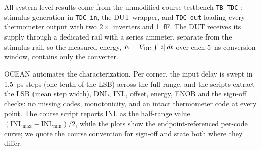 All system-level results come from the unmodified course testbench
\texttt{TB\_TDC} \cite{ee4615tb}: stimulus generation in \texttt{TDC\_in},
the DUT wrapper, and \texttt{TDC\_out} loading every thermometer output with
two $2\times$ inverters and \SI{1}{\femto\farad}. The DUT receives its supply
through a dedicated rail with a series ammeter, separate from the stimulus
rail, so the measured energy, $E=V_{\mathrm{DD}}\int |i|\,dt$ over each
\SI{5}{\nano\second} conversion window, contains only the converter.

OCEAN automates the characterization. Per corner, the input delay is swept in
\SI{1.5}{\pico\second} steps (one tenth of the LSB) across the full range,
and the scripts extract the LSB (mean step width), DNL, INL, offset, energy,
ENOB and the sign-off checks: no missing codes, monotonicity, and an intact
thermometer code at every point. The course script reports INL as the
half-range value $(\mathrm{INL}_{\max}-\mathrm{INL}_{\min})/2$, while the
plots show the endpoint-referenced per-code curve; we quote the course
convention for sign-off and state both where they differ.
